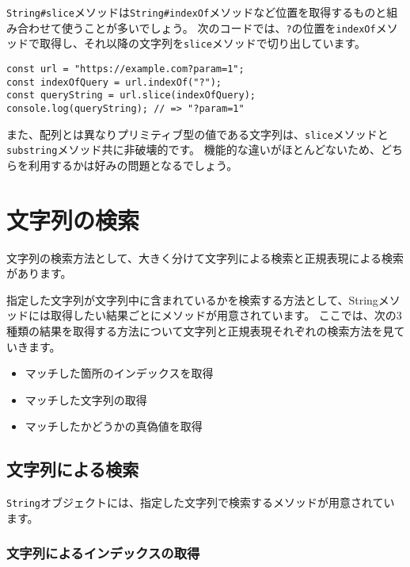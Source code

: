 \texttt{String\#slice}メソッドは\texttt{String\#indexOf}メソッドなど位置を取得するものと組み合わせて使うことが多いでしょう。
次のコードでは、\texttt{?}の位置を\texttt{indexOf}メソッドで取得し、それ以降の文字列を\texttt{slice}メソッドで切り出しています。

\begin{lstlisting}
const url = "https://example.com?param=1";
const indexOfQuery = url.indexOf("?");
const queryString = url.slice(indexOfQuery);
console.log(queryString); // => "?param=1"
\end{lstlisting}

また、配列とは異なりプリミティブ型の値である文字列は、\texttt{slice}メソッドと\texttt{substring}メソッド共に非破壊的です。
機能的な違いがほとんどないため、どちらを利用するかは好みの問題となるでしょう。

\hypertarget{search}{%
\section{文字列の検索}\label{search}}

文字列の検索方法として、大きく分けて文字列による検索と正規表現による検索があります。

指定した文字列が文字列中に含まれているかを検索する方法として、Stringメソッドには取得したい結果ごとにメソッドが用意されています。
ここでは、次の3種類の結果を取得する方法について文字列と正規表現それぞれの検索方法を見ていきます。

\begin{itemize}
\item
  マッチした箇所のインデックスを取得
\item
  マッチした文字列の取得
\item
  マッチしたかどうかの真偽値を取得
\end{itemize}

\hypertarget{search-by-string}{%
\subsection{文字列による検索}\label{search-by-string}}

\texttt{String}オブジェクトには、指定した文字列で検索するメソッドが用意されています。

\hypertarget{search-index-by-string}{%
\subsubsection{文字列によるインデックスの取得}\label{search-index-by-string}}

